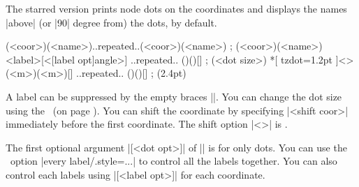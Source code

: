 The starred version \icmd{\tzcoorsquick*} prints node dots on the coordinates and displays the names |above| (or |90| degree from) the dots, by default.

\begin{tzdef}
\tzcoorsquick*(<coor>)(<name>)..repeated..(<coor>)(<name>) ;
(<coor>)(<name>){<label>}[<[label opt]angle>]
                                     ..repeated.. ()(){}[] ; (<dot size>)
 *[ tzdot=1.2pt ]<> (<m>)(<m>){}[] ..repeated.. ()(){}[] ; (2.4pt)
\end{tzdef}

\begin{tzcode}{.3}
{}
\end{tzcode}

A label can be suppressed by the empty braces |{}|.
You can change the dot size using the \threeways\ (on page \pageref{ss:threeways}).
You can shift the coordinate by specifying |<shift coor>| immediately before the first coordinate. The  shift option |<>| is .

\begin{tzcode}{.3}
\end{tzcode}

\remark
The first optional argument |[<dot opt>]| of |\tzcoorsquick*| is for only dots.
You can use the \Tikz\ option |every label/.style={...}| to control all the labels together.
You can also control each labels using |[<label opt>]| for each coordinate.

\begin{tzcode}{.3}
\end{tzcode}


